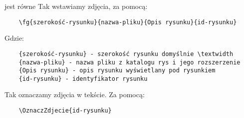 
jest równe
\clearpage
Tak wstawiamy zdjęcia, za pomocą:

\begin{verbatim}
	\fg{szerokość-rysunku}{nazwa-pliku}{Opis rysunku}{id-rysunku} 
 \end{verbatim}

Gdzie:
\begin{verbatim}
	{szerokość-rysunku} - szerokość rysunku domyślnie \textwidth
	{nazwa-pliku} - nazwa pliku z katalogu rys i jego rozszerzenie
	{Opis rysunku} - opis rysunku wyświetlany pod rysunkiem
	{id-rysunku} - identyfikator rysunku
\end{verbatim}

Tak oznaczamy zdjęcia  w tekście. Za pomocą:

\begin{verbatim}
	\OznaczZdjecie{id-rysunku}
	\end{verbatim}




